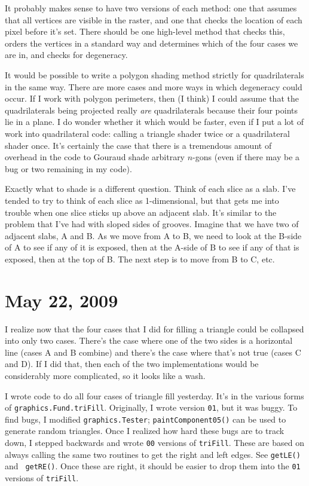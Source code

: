 \documentclass[titlepage,oneside,10pt]{article}
\begin{document}
It probably makes sense to have two versions of each method: one that
assumes that all vertices are visible in the raster, and one that
checks the location of each pixel before it's set. There should be one
high-level method that checks this, orders the vertices in a standard
way and determines which of the four cases we are in, and checks for
degeneracy. 

It would be possible to write a polygon shading method strictly for
quadrilaterals in the same way. There are more cases and more ways in
which degeneracy could occur. If I work with polygon perimeters, then
(I think) I could assume that the quadrilaterals being projected 
really \emph{are} quadrilaterals because their four points lie in a
plane. I do wonder whether it which would be faster, even if I put a
lot of work into quadrilateral code: calling a triangle shader twice
or a quadrilateral shader once. It's certainly the case that there is
a tremendous amount of overhead in the code to Gouraud shade arbitrary
$n$-gons (even if there may be a bug or two remaining in my code).

Exactly what to shade is a different question. Think of each slice as
a slab. I've tended to try to think of each slice as 1-dimensional,
but that gets me into trouble when one slice sticks up above an
adjacent slab. It's similar to the problem that I've had with sloped
sides of grooves. Imagine that we have two of adjacent slabs, A and B. As we
move from A to B, we need to look at the B-side of A to see if any of
it is exposed, then at the A-side of B to see if any of that is
exposed, then at the top of B. The next step is to move from B to C, etc.

\section{May 22, 2009}

I realize now that the four cases that I did for filling a triangle
could be collapsed into only two cases. There's the case where one of
the two sides is a horizontal line (cases A and B combine) and there's
the case where that's not true (cases C and D). If I did that, then
each of the two implementations would be considerably more
complicated, so it looks like a wash.

I wrote code to do all four cases of triangle fill yesterday. It's in
the various forms of {\tt graphics.Fund.triFill}. Originally, I wrote
version {\tt 01}, but it was buggy. To find bugs, I modified 
{\tt graphics.Tester}; {\tt paintComponent05()} can be used to
generate random triangles. Once I realized how hard these bugs are to
track down, I stepped backwards and wrote {\tt 00} versions of 
{\tt triFill}. These are based on always calling the same two routines
to get the right and left edges. See {\tt getLE()} and {\tt
  getRE()}. Once these are right, it should be easier to drop them
into the {\tt 01} versions of {\tt triFill}. 
\end{document}
